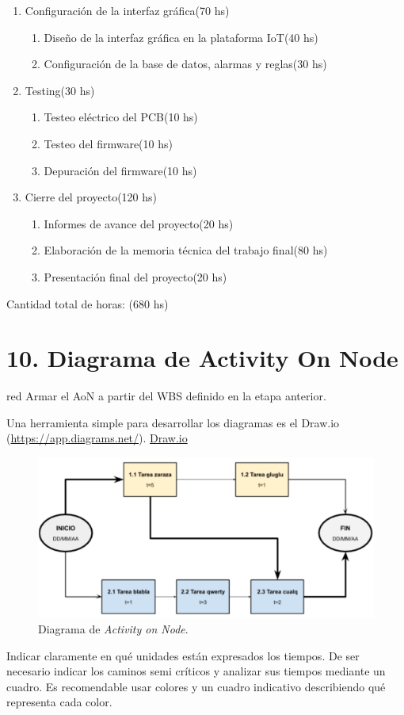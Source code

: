 \documentclass[
11pt, %
codirector, %
]{charter}
\begin{document}
\begin{enumerate}
\item Configuración de la interfaz gráfica(70 hs)
    \begin{enumerate}
		\item Diseño de la interfaz gráfica en la plataforma IoT(40 hs)
		\item Configuración de la base de datos, alarmas y reglas(30 hs)
	\end{enumerate}
\item Testing(30 hs)	
    \begin{enumerate}
		\item Testeo eléctrico del PCB(10 hs)
		\item Testeo del firmware(10 hs)
		\item Depuración del firmware(10 hs)
	\end{enumerate}
\item Cierre del proyecto(120 hs)	
    \begin{enumerate}
		\item Informes de avance del proyecto(20 hs)
		\item Elaboración de la memoria técnica del trabajo final(80 hs)
		\item Presentación final del proyecto(20 hs)
	\end{enumerate}


\end{enumerate}

Cantidad total de horas: (680 hs)

\section{10. Diagrama de Activity On Node}
\label{sec:AoN}

\begin{consigna}{red}
Armar el AoN a partir del WBS definido en la etapa anterior.

Una herramienta simple para desarrollar los diagramas es el Draw.io (\url{https://app.diagrams.net/}).
\href{https://app.diagrams.net}{Draw.io}


\begin{figure}[htpb]
\centering 
\includegraphics[width=.8\textwidth]{./Figuras/AoN.png}
\caption{Diagrama de \textit{Activity on Node}.}
\label{fig:AoN}
\end{figure}

Indicar claramente en qué unidades están expresados los tiempos.
De ser necesario indicar los caminos semi críticos y analizar sus tiempos mediante un cuadro.
Es recomendable usar colores y un cuadro indicativo describiendo qué representa cada color.

\end{consigna}
\end{document}
